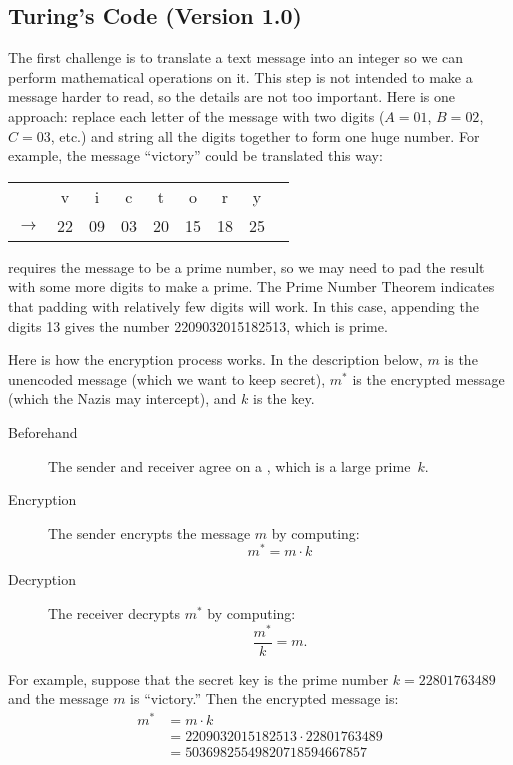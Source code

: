\subsection{Turing's Code (Version 1.0)}

The first challenge is to translate a text message into an integer so
we can perform mathematical operations on it.  This step is not
intended to make a message harder to read, so the details are not too
important.  Here is one approach: replace each letter of the message
with two digits ($A = 01$, $B = 02$, $C = 03$, etc.) and string all
the digits together to form one huge number.  For example, the message
``victory'' could be translated this way:
\begin{center}
\begin{tabular}{ccccccccc}
   &v & i & c & t & o & r & y \\ $\rightarrow$ & 22 & 09 & 03 & 20 &
  15 & 18 & 25
\end{tabular}
\end{center}
 requires the message to be a prime number, so we
may need to pad the result with some more digits to make a prime.  The
Prime Number Theorem indicates that padding with relatively few digits
will work.  In this case, appending the digits 13 gives the number
2209032015182513, which is prime.

Here is how the encryption process works.  In the description below,
$m$ is the unencoded message (which we want to keep secret), $m^*$ is
the encrypted message (which the Nazis may intercept), and $k$ is the
key.

\begin{description}

\item[Beforehand] The sender and receiver agree on a , which is a large prime~$k$.

\item[Encryption] The sender encrypts the message $m$ by computing:
\[
m^* = m \cdot k
\]

\item[Decryption] The receiver decrypts $m^*$ by computing:
\[
\frac{m^*}{k} = m.
\]

\iffalse = \frac{m \cdot k}{k} \fi

\end{description}

For example, suppose that the secret key is the prime number $k =
22801763489$ and the message $m$ is ``victory.''  Then the encrypted
message is:
\begin{align*}
m^* & = m \cdot k \\ & = 2209032015182513 \cdot 22801763489 \\ & =
50369825549820718594667857
\end{align*}

